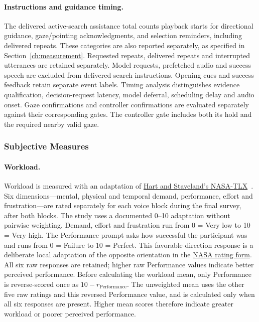 \paragraph{Instructions and guidance timing.} The delivered active-search assistance total counts playback starts for directional guidance, gaze/pointing acknowledgments, and selection reminders, including delivered repeats. These categories are also reported separately, as specified in Section~\ref{ch:measurement}. Requested repeats, delivered repeats and interrupted utterances are retained separately. Model requests, prefetched audio and success speech are excluded from delivered search instructions. Opening cues and success feedback retain separate event labels. Timing analysis distinguishes evidence qualification, decision-request latency, model deferral, scheduling delay and audio onset. Gaze confirmations and controller confirmations are evaluated separately against their corresponding gates. The controller gate includes both its hold and the required nearby valid gaze.

\subsubsection{Subjective Measures}
\paragraph{Workload.} Workload is measured with an adaptation of \href{https://doi.org/10.1016/S0166-4115(08)62386-9}{Hart and Staveland's NASA-TLX}~\cite{hart1988nasatlx}. Six dimensions---mental, physical and temporal demand, performance, effort and frustration---are rated separately for each voice block during the final survey, after both blocks. The study uses a documented 0--10 adaptation without pairwise weighting. Demand, effort and frustration run from 0 = Very low to 10 = Very high. The Performance prompt asks how successful the participant was and runs from 0 = Failure to 10 = Perfect. This favorable-direction response is a deliberate local adaptation of the opposite orientation in the \href{https://human-factors.arc.nasa.gov/groups/TLX/downloads/TLXScale.pdf}{NASA rating form}. All six raw responses are retained; higher raw Performance values indicate better perceived performance. Before calculating the workload mean, only Performance is reverse-scored once as $10-r_{\mathrm{Performance}}$. The unweighted mean uses the other five raw ratings and this reversed Performance value, and is calculated only when all six responses are present. Higher mean scores therefore indicate greater workload or poorer perceived performance.

